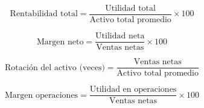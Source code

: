 \begin{equation}\label{eq:rentabilidad_total}
    \text{Rentabilidad total}=\frac{\text{Utilidad total}}{\text{Activo total promedio}}\times{100}
\end{equation}

\begin{equation}\label{eq:margen_neto}
    \text{Margen neto}=\frac{\text{Utilidad neta}}{\text{Ventas netas}}\times{100}
\end{equation}

\begin{equation}\label{eq:rotacion_activo}
    \text{Rotación del activo (veces)}=\frac{\text{Ventas netas}}{\text{Activo total promedio}}
\end{equation}

\begin{equation}\label{eq:margen_operaciones}
    \text{Margen operaciones} = \frac{\text{Utilidad en operaciones}}{\text{Ventas netas}}\times{100}
\end{equation}

